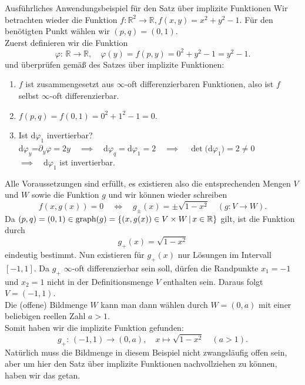 \begin{Beispiel}
    {Ausführliches Anwendungsbeispiel für den Satz über implizite Funktionen}
    Wir betrachten wieder die Funktion $f:\mathbb{R}^2\rightarrow\mathbb{R}, f(x,y)=x^2+y^2-1$. Für den benötigten Punkt wählen wir $(p,q)=(0,1)$. \\
    
    Zuerst definieren wir die Funktion
    \begin{equation*}
        \varphi:\,\mathbb{R}\rightarrow\mathbb{R}, \quad \varphi(y)=f(p,y)=0^2+y^2-1=y^2-1.
    \end{equation*}
    und überprüfen gemäß des Satzes über implizite Funktionen:
    \begin{enumerate}
        \item $f$ ist zusammengesetzt aus $\infty$-oft differenzierbaren Funktionen, also ist $f$ selbst $\infty$-oft differenzierbar.
        \item $f(p,q)=f(0,1)=0^2+1^2-1=0$.
        \item Ist d$\varphi_1$ invertierbar?\\
        d$\varphi_y$=$\partial_y\varphi=2y \quad \implies \quad$d$\varphi_q=$d$\varphi_1=2 \quad \implies \quad \det($d$\varphi_1)=2\neq0$\\
        $\implies \quad$d$\varphi_1$ ist invertierbar.
    \end{enumerate}
    Alle Voraussetzungen sind erfüllt, es existieren also die entsprechenden Mengen $V$ und $W$ sowie die Funktion $g$ und wir können wieder schreiben
    \begin{equation*}
        f(x,g(x))=0 \quad \Leftrightarrow \quad g_\pm(x)=\pm\sqrt{1-x^2} \quad (g:V\rightarrow W).
    \end{equation*}
    Da $(p,q)=(0,1)\in\text{graph}(g)=\left\{(x,g(x))\in V\times W\,|\, x\in\mathbb{R}\right\}$ gilt, ist die Funktion durch
    \begin{equation*}
        g_+(x)=\sqrt{1-x^2}
    \end{equation*}
    eindeutig bestimmt. Nun existieren für $g_+(x)$ nur Lösungen im Intervall $[-1,1]$. Da $g_+$ $\infty$-oft differenzierbar sein soll, dürfen die Randpunkte $x_1=-1$ und $x_2=1$ nicht in der Definitionsmenge $V$ enthalten sein. Daraus folgt $V=(-1,1)$.\\
    Die (offene) Bildmenge $W$ kann man dann wählen durch $W=(0,a)$ mit einer beliebigen reellen Zahl $a>1$. \\
    Somit haben wir die implizite Funktion gefunden:
    \begin{equation*}
        g_+:\,(-1,1)\rightarrow (0,a), \quad x\mapsto\sqrt{1-x^2} \quad (a>1).
    \end{equation*}
    Natürlich muss die Bildmenge in diesem Beispiel nicht zwangsläufig offen sein, aber um hier den Satz über implizite Funktionen nachvollziehen zu können, haben wir das getan. \\
    

\end{Beispiel}
